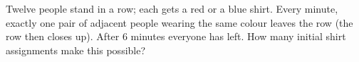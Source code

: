 Twelve people stand in a row; each gets a red or a blue shirt. Every minute, exactly one pair of adjacent people wearing the same colour leaves the row (the row then closes up). After $6$ minutes everyone has left. How many initial shirt assignments make this possible?
